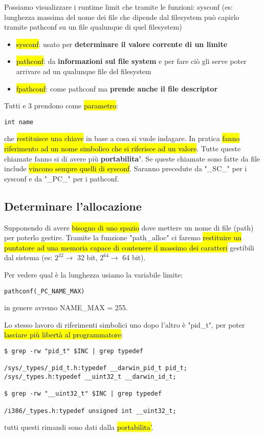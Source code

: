 Possiamo visualizzare i runtime limit che tramite le funzioni: sysconf (es: lunghezza massima del nome dei file che dipende dal filesystem può capirlo tramite pathconf su un file qualunque di quel filesystem)

\begin{itemize}
	\item \hl{sysconf}: usato per \textbf{determinare il valore corrente di un limite}
	
	\item \hl{pathconf}: da \textbf{informazioni sul file system} e per fare ciò gli serve poter arrivare ad un qualunque file del filesystem
	
	\item \hl{fpathconf}: come pathconf ma \textbf{prende anche il file descriptor}
\end{itemize}

Tutti e 3 prendono come \hl{parametro}:

\begin{lstlisting}
int name
\end{lstlisting}

che \hl{restituisce una chiave} in base a cosa si vuole indagare. In pratica \hl{fanno riferimento ad un nome simbolico che si riferisce ad un valore}.
Tutte queste chiamate fanno si di avere più \textbf{portabilita'}. Se queste chiamate sono fatte da file include \hl{vincono sempre quelli di sysconf}. Saranno precedute da "\_SC\_" per i sysconf e da "\_PC\_" per i pathconf.


\subsection{Determinare l'allocazione}

Supponendo di avere \hl{bisogno di uno spazio} dove mettere un nome di file (path) per poterlo gestire. Tramite la funzione "path\_alloc" ci faremo \hl{restituire un puntatore ad una memoria capace di contenere il massimo dei caratteri} gestibili dal sistema (es: $2^32 \to$ 32 bit, $2^64 \to$ 64 bit).

Per vedere qual è la lunghezza usiamo la variabile limite:

\begin{lstlisting}
pathconf(_PC_NAME_MAX)
\end{lstlisting}

in genere avremo NAME\_MAX = 255.

Lo stesso lavoro di riferimenti simbolici uno dopo l'altro è "pid\_t", per poter \hl{lasciare più libertà al programmatore}:

\begin{lstlisting}
$ grep -rw "pid_t" $INC | grep typedef

/sys/_types/_pid_t.h:typedef __darwin_pid_t pid_t;
/sys/_types.h:typedef __uint32_t __darwin_id_t;

$ grep -rw "__uint32_t" $INC | grep typedef

/i386/_types.h:typedef unsigned int __uint32_t;
\end{lstlisting}

tutti questi rimandi sono dati dalla \hl{portabilita'}.
